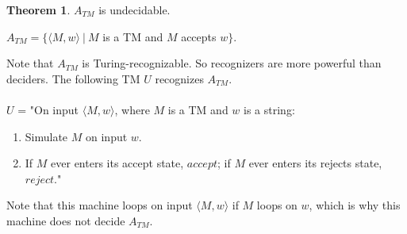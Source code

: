 \documentclass[11pt]{article}
\theoremstyle{definition}
\newtheorem{thm}{Theorem}[section]
\begin{document}
\begin{thm}
    $A_{TM}$ is undecidable.
\begin{center}
    $A_{TM} = \{\langle M,w\rangle\ |\ M$ is a TM and $M$ accepts $w\}$.
\end{center}
Note that $A_{TM}$ is Turing-recognizable. So recognizers are more powerful than deciders. The following TM $U$ recognizes $A_{TM}$.\\\\
$U$ = "On input $\langle M,w\rangle$, where $M$ is a TM and $w$ is a string:
\begin{enumerate}
    \item Simulate $M$ on input $w$.
    \item If $M$ ever enters its accept state, $accept$; if $M$ ever enters its rejects state, $reject$."
\end{enumerate}
Note that this machine loops on input $\langle M,w\rangle$ if $M$ loops on $w$, which is why this machine does not decide $A_{TM}$. 
\end{thm}
\end{document}
